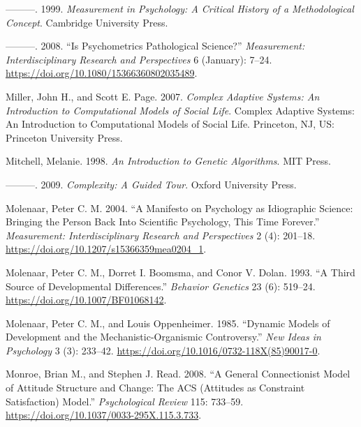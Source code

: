 \documentclass[
  a4paper,
  DIV=11,
  numbers=noendperiod,
  oneside]{scrreprt}
\newlength{\cslhangindent}
\newenvironment{CSLReferences}[2] %
 {\begin{list}{}{%
  \setlength{\itemindent}{0pt}
  \setlength{\leftmargin}{0pt}
  \setlength{\parsep}{0pt}
  \ifodd #1
   \setlength{\leftmargin}{\cslhangindent}
   \setlength{\itemindent}{-1\cslhangindent}
  \fi
  \setlength{\itemsep}{#2\baselineskip}}}
 {\end{list}}
\begin{document}
\begin{CSLReferences}{1}{0}
---------. 1999. \emph{Measurement in {Psychology}: {A Critical History}
of a {Methodological Concept}}. {Cambridge University Press}.

---------. 2008. {``Is {Psychometrics Pathological Science}?''}
\emph{Measurement: Interdisciplinary Research and Perspectives} 6
(January): 7--24. \url{https://doi.org/10.1080/15366360802035489}.

Miller, John H., and Scott E. Page. 2007. \emph{Complex Adaptive
Systems: {An} Introduction to Computational Models of Social Life}.
Complex Adaptive Systems: {An} Introduction to Computational Models of
Social Life. {Princeton, NJ, US}: {Princeton University Press}.

Mitchell, Melanie. 1998. \emph{An {Introduction} to {Genetic
Algorithms}}. {MIT Press}.

---------. 2009. \emph{Complexity: {A Guided Tour}}. {Oxford University
Press}.

Molenaar, Peter C. M. 2004. {``A {Manifesto} on {Psychology} as
{Idiographic Science}: {Bringing} the {Person Back Into Scientific
Psychology}, {This Time Forever}.''} \emph{Measurement:
Interdisciplinary Research and Perspectives} 2 (4): 201--18.
\url{https://doi.org/10.1207/s15366359mea0204_1}.

Molenaar, Peter C. M., Dorret I. Boomsma, and Conor V. Dolan. 1993. {``A
Third Source of Developmental Differences.''} \emph{Behavior Genetics}
23 (6): 519--24. \url{https://doi.org/10.1007/BF01068142}.

Molenaar, Peter C. M., and Louis Oppenheimer. 1985. {``Dynamic Models of
Development and the Mechanistic-Organismic Controversy.''} \emph{New
Ideas in Psychology} 3 (3): 233--42.
\url{https://doi.org/10.1016/0732-118X(85)90017-0}.

Monroe, Brian M., and Stephen J. Read. 2008. {``A General Connectionist
Model of Attitude Structure and Change: {The ACS} ({Attitudes} as
{Constraint Satisfaction}) Model.''} \emph{Psychological Review} 115:
733--59. \url{https://doi.org/10.1037/0033-295X.115.3.733}.


\end{CSLReferences}
\end{document}
